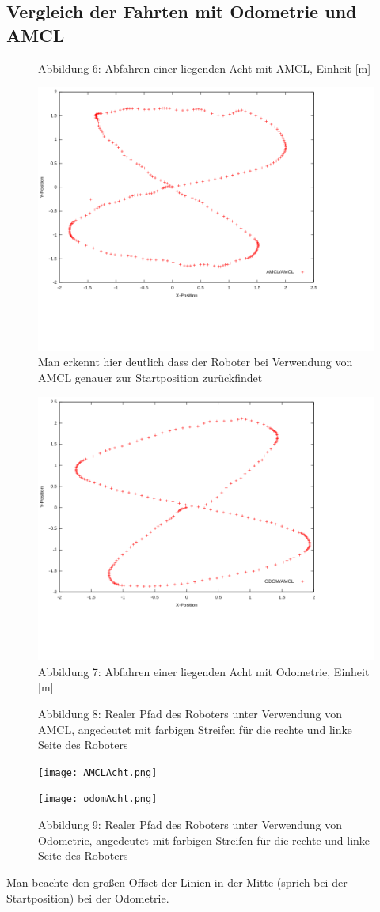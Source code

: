 \documentclass[11pt,a4paper]{article}
\begin{document}
\subsection*{Vergleich der Fahrten mit Odometrie und AMCL}
\begin{figure}[H]
  \caption*{Abbildung 6: Abfahren einer liegenden Acht mit AMCL, Einheit [m]}
  \includegraphics[scale = 0.45]{Plots/better ones/amclamclacht.png}
  \vspace{-20mm}
\\ Man erkennt hier deutlich dass der Roboter bei Verwendung von AMCL genauer zur Startposition zurückfindet
  \caption*{Abbildung 7: Abfahren einer liegenden Acht mit Odometrie, Einheit [m]}
  \includegraphics[scale = 0.45]{Plots/better ones/odomamclacht.png}
  \centering
\end{figure}
\begin{figure}[H]
  \caption*{Abbildung 8: Realer Pfad des Roboters unter Verwendung von AMCL, angedeutet mit farbigen Streifen für die rechte und linke Seite des Roboters}
  \texttt{[image: AMCLAcht.png]}
    \caption*{Abbildung 9: Realer Pfad des Roboters unter Verwendung von Odometrie, angedeutet mit farbigen Streifen für die rechte und linke Seite des Roboters}
    \texttt{[image: odomAcht.png]}
    \centering
  \end{figure}

Man beachte den großen Offset der Linien in der Mitte (sprich bei der Startposition) bei der Odometrie.
\end{document}
